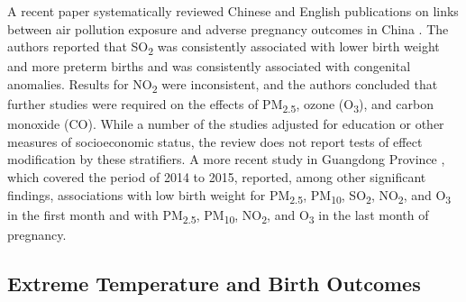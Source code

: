 A recent paper systematically reviewed Chinese and English publications
on links between air pollution exposure and adverse pregnancy outcomes
in China \autocite{jacobs_association_2017}. The authors reported that SO\textsubscript{2} was
consistently associated with lower birth weight and more preterm births
and \PARPMTEN was consistently associated with congenital anomalies. Results for NO\textsubscript{2} were
inconsistent, and the authors concluded that further studies were
required on the effects of PM\textsubscript{2.5}, ozone (O\textsubscript{3}), and carbon monoxide (CO).
While a number of the studies adjusted for education or other measures
of socioeconomic status, the review does not report tests of effect
modification by these stratifiers. A more recent study in Guangdong
Province \autocite{liu_association_2019}, which covered the period of 2014 to 2015, reported, among other significant findings, associations with low birth weight for PM\textsubscript{2.5}, PM\textsubscript{10}, SO\textsubscript{2}, NO\textsubscript{2}, and O\textsubscript{3} in the first month and with PM\textsubscript{2.5}, PM\textsubscript{10}, NO\textsubscript{2}, and O\textsubscript{3} in the last month of pregnancy.

\subsection{Extreme Temperature and Birth Outcomes\label{extreme-temperature-and-birth-outcomes}}

